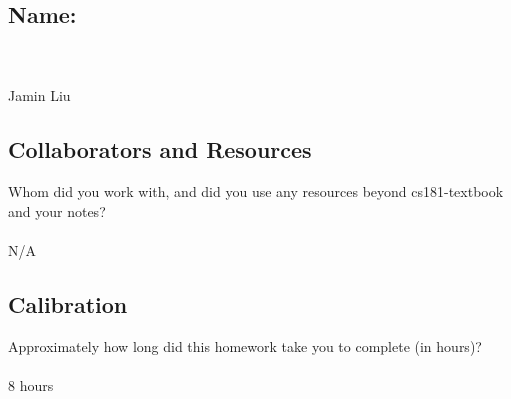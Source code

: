 \documentclass[submit]{harvardml}
\begin{document}
\newpage
\subsection*{Name:}
\\ \\ 
Jamin Liu

\subsection*{Collaborators and Resources}
Whom did you work with, and did you use any resources beyond cs181-textbook and your notes? \\ \\
N/A

\subsection*{Calibration}
Approximately how long did this homework take you to complete (in hours)? 
\\\\ 8 hours
\end{document}
